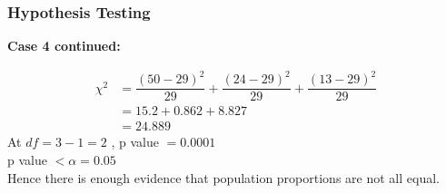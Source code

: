 \documentclass{beamer}
\begin{document}
\begin{frame}
  \frametitle{Hypothesis Testing}
  \begin{block}{\textbf{Case 4 continued:}}
   
    \begin{equation}
        \begin{aligned}
            \chi^{2} &= \dfrac{(50 - 29)^{2}}{29} + \dfrac{(24 -29)^{2}}{29} + \dfrac{(13 -29)^{2}}{29}\\
            &= 15.2 + 0.862 + 8.827\\
            &= 24.889 
        \end{aligned}
    \end{equation}
    At $df = 3 - 1 = 2 $ , p value $= 0.0001  $\\
    p value $< \alpha = 0.05$\\
    Hence there is enough evidence that population proportions are not all equal.


    \end{block}
\end{frame}

\end{document}
